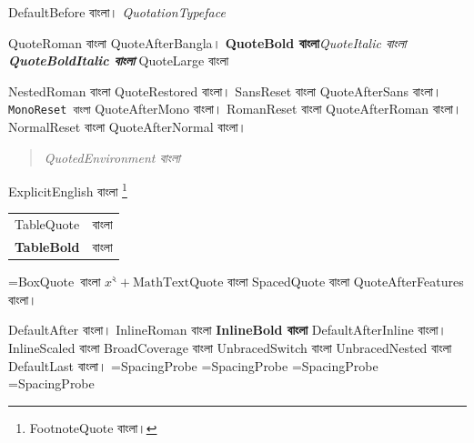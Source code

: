 DefaultBefore বাংলা।
\textit{\textenglish{\quotefont QuotationTypeface}}
\usebox\localfontbox\par
{\quotefont
  QuoteRoman বাংলা QuoteAfterBangla।
  \textbf{QuoteBold বাংলা}\textit{QuoteItalic বাংলা}
  \textbf{\textit{QuoteBoldItalic বাংলা}}
  {\fontsize{16}{20}\selectfont QuoteLarge বাংলা}\par
  {\nestedfont NestedRoman বাংলা} QuoteRestored বাংলা।
  \textsf{SansReset বাংলা} QuoteAfterSans বাংলা।
  \texttt{MonoReset বাংলা} QuoteAfterMono বাংলা।
  {\rmfamily RomanReset বাংলা} QuoteAfterRoman বাংলা।
  {\normalfont NormalReset বাংলা} QuoteAfterNormal বাংলা।
  \begin{quotation}\textit{QuotedEnvironment বাংলা}\end{quotation}
  \textenglish{\quotefont ExplicitEnglish বাংলা}
  \footnote{\quotefont FootnoteQuote বাংলা।}
  \begin{tabular}{ll}TableQuote & বাংলা\\\textbf{TableBold} & বাংলা\end{tabular}
  =\hbox{BoxQuote বাংলা}
  $x^২+\text{MathTextQuote বাংলা}$
  {SpacedQuote বাংলা} QuoteAfterFeatures বাংলা।
}
DefaultAfter বাংলা।
{InlineRoman বাংলা \textbf{InlineBold বাংলা}}
DefaultAfterInline বাংলা।
{InlineScaled বাংলা}
{BroadCoverage বাংলা}
{\quotefont UnbracedSwitch বাংলা \nestedfont UnbracedNested বাংলা}
DefaultLast বাংলা।
{\quotefont
 =\hbox{SpacingProbe}
 {
  =\hbox{SpacingProbe}}
 {
  =\hbox{SpacingProbe}}
 =\hbox{SpacingProbe}}
